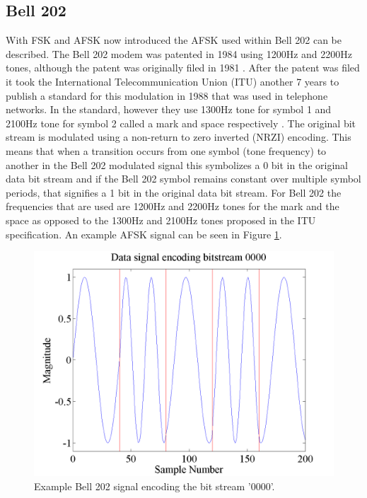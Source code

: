 \subsection{Bell 202}
With FSK and AFSK now introduced the AFSK used within Bell 202 can be described. The Bell 202 modem was patented in 1984 using 1200Hz and 2200Hz tones, although the patent was originally filed in 1981 \cite{stauffer1984fsk}. After the patent was filed it took the International Telecommunication Union (ITU) another 7 years to publish a standard for this modulation in 1988 that was used in telephone networks. In the standard, however they use 1300Hz tone for symbol 1 and 2100Hz tone for symbol 2 called a mark and space respectively \cite{ITUV23}. The original bit stream is modulated using a non-return to zero inverted (NRZI) encoding. This means that when a transition occurs from one symbol (tone frequency) to another in the Bell 202 modulated signal this symbolizes a 0 bit in the original data bit stream and if the Bell 202 symbol remains constant over multiple symbol periods, that signifies a 1 bit in the original data bit stream. For Bell 202 the frequencies that are used are 1200Hz and 2200Hz tones for the mark and the space as opposed to the 1300Hz and 2100Hz tones proposed in the ITU specification. An example AFSK signal can be seen in Figure \ref{exampleBitStream}.
\begin{figure}
  \centering
	\includegraphics[width=0.75\linewidth]{images/Datasignalencodingbitstream0000.png} 
	\caption{Example Bell 202 signal encoding the bit stream '0000'.}
	\label{exampleBitStream}
\end{figure}
